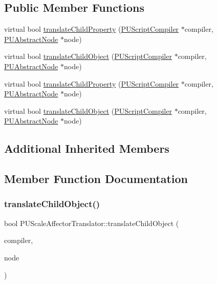 \subsection*{Public Member Functions}
\begin{DoxyCompactItemize}
\item 
virtual bool \hyperlink{classPUScaleAffectorTranslator_a03225e1708f212e88b876e6bc43ee367}{translate\+Child\+Property} (\hyperlink{classPUScriptCompiler}{P\+U\+Script\+Compiler} $\ast$compiler, \hyperlink{classPUAbstractNode}{P\+U\+Abstract\+Node} $\ast$node)
\item 
virtual bool \hyperlink{classPUScaleAffectorTranslator_a24c9b3830927b9b6f3d381876f9237c5}{translate\+Child\+Object} (\hyperlink{classPUScriptCompiler}{P\+U\+Script\+Compiler} $\ast$compiler, \hyperlink{classPUAbstractNode}{P\+U\+Abstract\+Node} $\ast$node)
\item 
virtual bool \hyperlink{classPUScaleAffectorTranslator_acb96dbcff6bc9be3ed04e455511b977c}{translate\+Child\+Property} (\hyperlink{classPUScriptCompiler}{P\+U\+Script\+Compiler} $\ast$compiler, \hyperlink{classPUAbstractNode}{P\+U\+Abstract\+Node} $\ast$node)
\item 
virtual bool \hyperlink{classPUScaleAffectorTranslator_a56754b9b1ebef5d08894ddb2f590a0e9}{translate\+Child\+Object} (\hyperlink{classPUScriptCompiler}{P\+U\+Script\+Compiler} $\ast$compiler, \hyperlink{classPUAbstractNode}{P\+U\+Abstract\+Node} $\ast$node)
\end{DoxyCompactItemize}
\subsection*{Additional Inherited Members}


\subsection{Member Function Documentation}
\mbox{\label{classPUScaleAffectorTranslator_a24c9b3830927b9b6f3d381876f9237c5}} 
\subsubsection{\texorpdfstring{translate\+Child\+Object()}{translateChildObject()}\hspace{0.1cm}{\footnotesize\ttfamily [1/2]}}
{\footnotesize\ttfamily bool P\+U\+Scale\+Affector\+Translator\+::translate\+Child\+Object (\begin{DoxyParamCaption}\item[{\hyperlink{classPUScriptCompiler}{P\+U\+Script\+Compiler} $\ast$}]{compiler,  }\item[{\hyperlink{classPUAbstractNode}{P\+U\+Abstract\+Node} $\ast$}]{node }\end{DoxyParamCaption})\hspace{0.3cm}{\ttfamily [virtual]}}

